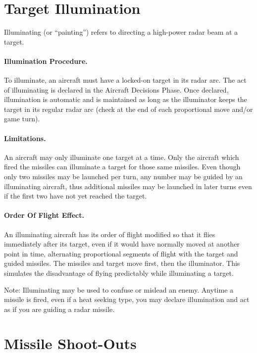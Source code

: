 \section{Target Illumination}
\label{rule:target-illumination}

Illuminating (or “painting”) refers to directing a high-power radar beam at a target.

\paragraph{Illumination Procedure.} To illuminate, an aircraft must have a locked-on target in its radar arc. The act of illuminating is declared in the Aircraft Decisions Phase. Once declared, illumination is automatic and is maintained as long as the illuminator keeps the target in its regular radar arc (check at the end of each proportional move and/or game turn).

\paragraph{Limitations.} An aircraft may only illuminate one target at a time. Only the aircraft which fired the missiles can illuminate a target for those same missiles. Even though only two missiles may be launched per turn, any number may be guided by an illuminating aircraft, thus additional missiles may be launched in later turns even if the first two have not yet reached the target.

\paragraph{Order Of Flight Effect.} An illuminating aircraft has its order of flight modified so that it flies immediately after its target, even if it would have normally moved at another point in time, alternating proportional segments of flight with the target and guided missiles. The missiles and target move first, then the illuminator. This simulates the disadvantage of flying predictably while illuminating a target.

Note: Illuminating may be used to confuse or mislead an enemy. Anytime a missile is fired, even if a heat seeking type, you may declare illumination and act as if you are guiding a radar missile.

\section{Missile Shoot-Outs}
\label{rule:missile-shoot-outs}


